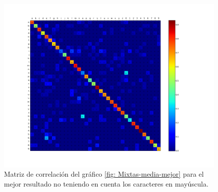 			\begin{figure}[!htbp]
				\centerline{\includegraphics[scale=0.4]{img/resultados/mixtas/best_mean_matrix_Alpha0,01_4080-8_ins.png}}
				\caption[Matriz de correlación ``case insensitive'' para mixtas media]{Matriz de correlación del gráfico \ref{fig: Mixtas-media-mejor} para el mejor resultado no teniendo en cuenta los caracteres en mayúscula.}
				\label{fig: MatrizIns-Mixtas-media-mejor}
			\end{figure}

